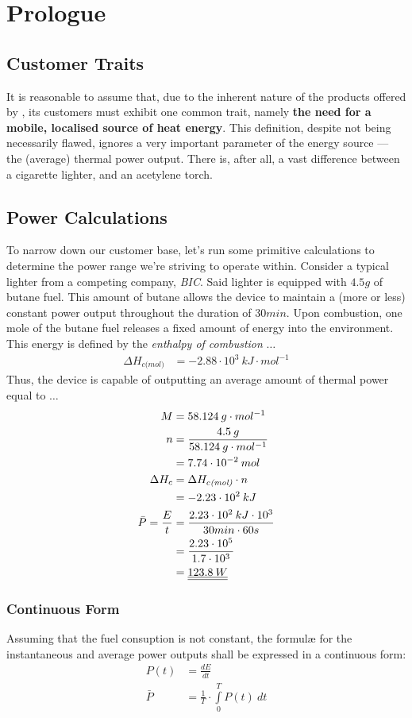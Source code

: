 \section{Prologue}
\subsection{Customer Traits}
It is reasonable to assume that, due to the inherent nature of the products offered by \fw, its customers must
exhibit one common trait, namely \textbf{the need for a mobile, localised source of heat energy}.
This definition, despite not being necessarily flawed, ignores a very important parameter of the
energy source --- the (average) thermal power output.
There is, after all, a vast difference between a cigarette lighter, and an acetylene torch.
\subsection{Power Calculations}
To narrow down our customer base, let's run some primitive calculations to determine the power range we're striving to
operate within.
Consider a typical lighter from a competing company, \textit{BIC}. Said lighter is equipped with $4.5g$ of butane fuel.
This amount of butane allows the device to maintain a (more or less) constant power output throughout the duration of $30min$.
Upon combustion, one mole of the butane fuel releases a fixed amount of energy into the environment. This energy is defined
by the \textit{enthalpy of combustion} $\dots$
\begin{align*}
	\Delta H_{c\textit{(mol)}} &= -2.88 \cdot 10^3 \: kJ \cdot mol^{-1}
\end{align*}
Thus, the device is capable of outputting an average amount of thermal power equal to $\dots$
\begin{align*}
	M &= 58.124 \: g \cdot mol^{-1} \\
	n &= \frac{4.5 \: g}{58.124 \: g \cdot mol^{-1}} \\
	  &= 7.74 \cdot 10^{-2} \: mol \\
	\Delta H_c &= \Delta H_{c\textit{(mol)}} \cdot n \\
		   &= -2.23 \cdot 10^2 \: kJ \\
	\bar{P} = \frac{E}{t} &= \frac{2.23 \cdot 10^2 \: kJ \cdot 10^3}{30min \cdot 60s} \\
			&= \frac{2.23 \cdot 10^5}{1.7 \cdot 10^3} \\
			&= \underline{\underline{123.8 \: W}}
\end{align*}
\subsubsection{Continuous Form}
Assuming that the fuel consuption is not constant, the formul{\ae} for the instantaneous and average power outputs
shall be expressed in a continuous form:
\begin{align*}
	P(t) &= \frac{dE}{dt} \\
	\bar{P} &= \frac{1}{T} \cdot \int\limits_{0}^{T} P(t) \: dt
\end{align*}
